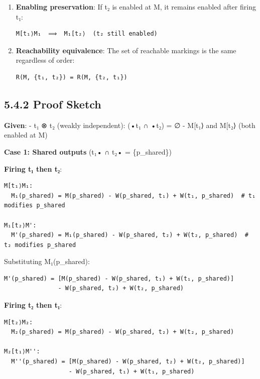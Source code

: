 \begin{enumerate}
\def\labelenumi{\arabic{enumi}.}
\setcounter{enumi}{1}
\item
  \textbf{Enabling preservation}: If t₂ is enabled at M, it remains
  enabled after firing t₁:

\begin{lstlisting}
M[t₁⟩M₁  ⟹  M₁[t₂⟩  (t₂ still enabled)
\end{lstlisting}
\item
  \textbf{Reachability equivalence}: The set of reachable markings is
  the same regardless of order:

\begin{lstlisting}
R(M, {t₁, t₂}) = R(M, {t₂, t₁})
\end{lstlisting}
\end{enumerate}

\hypertarget{proof-sketch}{%
\subsection{5.4.2 Proof Sketch}\label{proof-sketch}}

\textbf{Given}: - t₁ ⊗ t₂ (weakly independent): (•t₁ ∩ •t₂) = ∅ -
M{[}t₁⟩ and M{[}t₂⟩ (both enabled at M)

\textbf{Case 1: Shared outputs} (t₁• ∩ t₂• = \{p\_shared\})

\textbf{Firing t₁ then t₂}:

\begin{lstlisting}
M[t₁⟩M₁:
  M₁(p_shared) = M(p_shared) - W(p_shared, t₁) + W(t₁, p_shared)  # t₁ modifies p_shared

M₁[t₂⟩M':
  M'(p_shared) = M₁(p_shared) - W(p_shared, t₂) + W(t₂, p_shared)  # t₂ modifies p_shared
\end{lstlisting}

Substituting M₁(p\_shared):

\begin{lstlisting}
M'(p_shared) = [M(p_shared) - W(p_shared, t₁) + W(t₁, p_shared)] 
               - W(p_shared, t₂) + W(t₂, p_shared)
\end{lstlisting}

\textbf{Firing t₂ then t₁}:

\begin{lstlisting}
M[t₂⟩M₂:
  M₂(p_shared) = M(p_shared) - W(p_shared, t₂) + W(t₂, p_shared)

M₂[t₁⟩M'':
  M''(p_shared) = [M(p_shared) - W(p_shared, t₂) + W(t₂, p_shared)] 
                  - W(p_shared, t₁) + W(t₁, p_shared)
\end{lstlisting}

